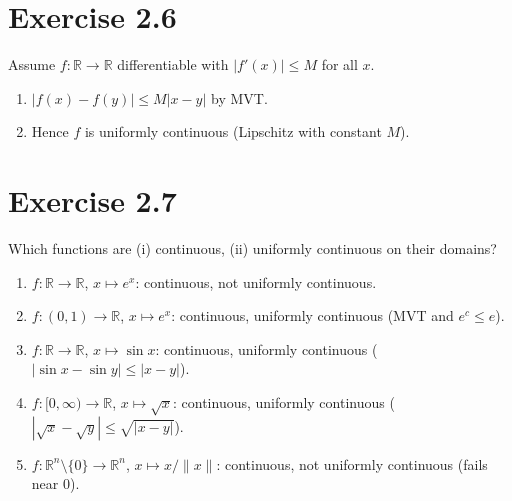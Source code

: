 \documentclass[11pt,a4paper]{article}
\begin{document}
\section*{Exercise 2.6}
Assume $f:\mathbb{R}\to\mathbb{R}$ differentiable with $|f'(x)|\le M$ for all $x$.
\begin{enumerate}
\renewcommand\labelenumi{(\alph{enumi})}
\item $|f(x)-f(y)|\le M|x-y|$ by MVT.
\item Hence $f$ is uniformly continuous (Lipschitz with constant $M$).
\end{enumerate}

\section*{Exercise 2.7}
Which functions are (i) continuous, (ii) uniformly continuous on their domains?
\begin{enumerate}
\renewcommand\labelenumi{(\alph{enumi})}
\item $f:\mathbb{R}\to\mathbb{R}$, $x\mapsto e^x$: continuous, not uniformly continuous.
\item $f:(0,1)\to\mathbb{R}$, $x\mapsto e^x$: continuous, uniformly continuous (MVT and $e^c\le e$).
\item $f:\mathbb{R}\to\mathbb{R}$, $x\mapsto\sin x$: continuous, uniformly continuous ($|\sin x-\sin y|\le |x-y|$).
\item $f:[0,\infty)\to\mathbb{R}$, $x\mapsto \sqrt{x}$: continuous, uniformly continuous ($|\sqrt{x}-\sqrt{y}|\le \sqrt{|x-y|}$).
\item[\textit{f)}] $f:\mathbb{R}^n\setminus\{0\}\to\mathbb{R}^n$, $x\mapsto x/\|x\|$: continuous, not uniformly continuous (fails near $0$).
\end{enumerate}
\end{document}
